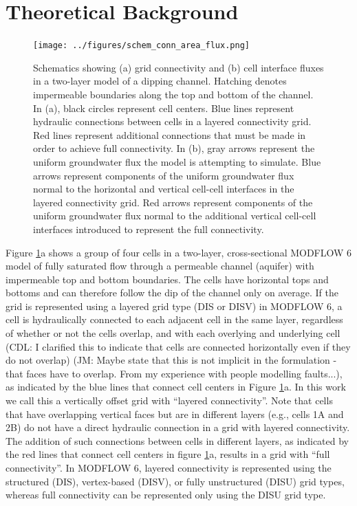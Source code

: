 \documentclass{article}
\begin{document}
\section{Theoretical Background}

\begin{figure}
	\begin{center}
	\texttt{[image: ../figures/schem\_conn\_area\_flux.png]}
	\caption{Schematics showing (a) grid connectivity and (b) cell interface fluxes in a two-layer model of a dipping channel. Hatching denotes impermeable boundaries along the top and bottom of the channel. In (a), black circles represent cell centers. Blue lines represent hydraulic connections between cells in a layered connectivity grid. Red lines represent additional connections that must be made in order to achieve full connectivity. In (b), gray arrows represent the uniform groundwater flux the model is attempting to simulate. Blue arrows represent components of the uniform groundwater flux normal to the horizontal and vertical cell-cell interfaces in the layered connectivity grid. Red arrows represent components of the uniform groundwater flux normal to the additional vertical cell-cell interfaces introduced to represent the full connectivity.}
	\label{fig:schem-conn-area-flux}
	\end{center}
\end{figure}

Figure \ref{fig:schem-conn-area-flux}a shows a group of four cells in a two-layer, cross-sectional MODFLOW 6 model of fully saturated flow through a permeable channel (aquifer) with impermeable top and bottom boundaries. The cells have horizontal tops and bottoms and can therefore follow the dip of the channel only on average. If the grid is represented using a layered grid type (DIS or DISV) in MODFLOW 6, a cell is hydraulically connected to each adjacent cell in the same layer, regardless of whether or not the cells overlap, and with each overlying and underlying cell {\color{red} (CDL: I clarified this to indicate that cells are connected horizontally even if they do not overlap) (JM: Maybe state that this is not implicit in the formulation - that faces have to overlap. From my experience with people modelling faults...)}, as indicated by the blue lines that connect cell centers in Figure \ref{fig:schem-conn-area-flux}a. In this work we call this a vertically offset grid with ``layered connectivity''.  Note that cells that have overlapping vertical faces but are in different layers (e.g., cells 1A and 2B) do not have a direct hydraulic connection in a grid with layered connectivity. The addition of such connections between cells in different layers, as indicated by the red lines that connect cell centers in figure \ref{fig:schem-conn-area-flux}a, results in a grid with ``full connectivity''.  In MODFLOW 6, layered connectivity is represented using the structured (DIS), vertex-based (DISV), or fully unstructured (DISU) grid types, whereas full connectivity can be represented only using the DISU grid type.
\end{document}
